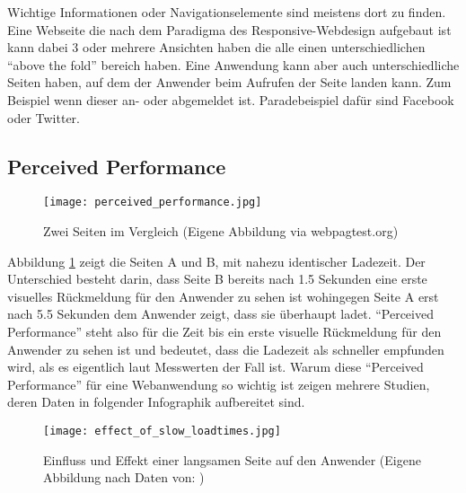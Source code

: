 		Wichtige Informationen oder Navigationselemente sind meistens dort zu finden. Eine Webseite die nach dem Paradigma des Responsive-Webdesign aufgebaut ist kann dabei 3 oder mehrere Ansichten haben die alle einen unterschiedlichen "`above the fold"' bereich haben. Eine Anwendung kann aber auch unterschiedliche Seiten haben, auf dem der Anwender beim Aufrufen der Seite landen kann. Zum Beispiel wenn dieser an- oder abgemeldet ist. Paradebeispiel dafür sind Facebook oder Twitter.

		\pagebreak




	\subsection{Perceived Performance} %
	\label{sub:perceived_performance}
		\begin{figure}[htbp]
			\begin{center}
				\texttt{[image: perceived\_performance.jpg]}
				\caption{Zwei Seiten im Vergleich (Eigene Abbildung via webpagtest.org)}
				\label{fig:perceived_performance}
			\end{center}
		\end{figure}

		Abbildung \ref{fig:perceived_performance} zeigt die Seiten A und B, mit nahezu identischer Ladezeit. Der Unterschied besteht darin, dass Seite B bereits nach 1.5 Sekunden eine erste visuelles Rückmeldung für den Anwender zu sehen ist wohingegen Seite A erst nach 5.5 Sekunden dem Anwender zeigt, dass sie überhaupt ladet.
		"`Perceived Performance"' steht also für die Zeit bis ein erste visuelle Rückmeldung für den Anwender zu sehen ist und bedeutet, dass die Ladezeit als schneller empfunden wird, als es eigentlich laut Messwerten der Fall ist. Warum diese "`Perceived Performance"' für eine Webanwendung so wichtig ist zeigen mehrere Studien, deren Daten in folgender Infographik aufbereitet sind.

		\begin{figure}[htbp]
			\begin{center}
				\texttt{[image: effect\_of\_slow\_loadtimes.jpg]}
				\caption{Einfluss und Effekt einer langsamen Seite auf den Anwender (Eigene Abbildung nach Daten von: \autocite[p. 8]{radware14})}
				\label{fig:effect_of_slow_loadtimes}
			\end{center}
		\end{figure}

